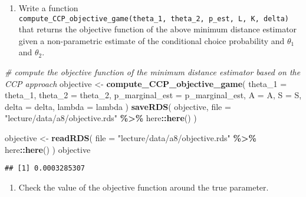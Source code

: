\documentclass[
]{book}
\newenvironment{Shaded}{\begin{snugshade}}{\end{snugshade}}
\newcommand{\AttributeTok}[1]{\textcolor[rgb]{0.13,0.29,0.53}{#1}}
\newcommand{\CommentTok}[1]{\textcolor[rgb]{0.56,0.35,0.01}{\textit{#1}}}
\newcommand{\FunctionTok}[1]{\textcolor[rgb]{0.13,0.29,0.53}{\textbf{#1}}}
\newcommand{\NormalTok}[1]{#1}
\newcommand{\OtherTok}[1]{\textcolor[rgb]{0.56,0.35,0.01}{#1}}
\newcommand{\SpecialCharTok}[1]{\textcolor[rgb]{0.81,0.36,0.00}{\textbf{#1}}}
\newcommand{\StringTok}[1]{\textcolor[rgb]{0.31,0.60,0.02}{#1}}
\providecommand{\tightlist}{%
  \setlength{\itemsep}{0pt}\setlength{\parskip}{0pt}}
\begin{document}
\begin{enumerate}
\def\labelenumi{\arabic{enumi}.}
\setcounter{enumi}{1}
\tightlist
\item
  Write a function \texttt{compute\_CCP\_objective\_game(theta\_1,\ theta\_2,\ p\_est,\ L,\ K,\ delta)} that returns the objective function of the above minimum distance estimator given a non-parametric estimate of the conditional choice probability and \(\theta_1\) and \(\theta_2\).
\end{enumerate}

\begin{Shaded}
\begin{Highlighting}[]
\CommentTok{\# compute the objective function of the minimum distance estimator based on the CCP approach}
\NormalTok{objective }\OtherTok{\textless{}{-}} 
  \FunctionTok{compute\_CCP\_objective\_game}\NormalTok{(}
    \AttributeTok{theta\_1 =}\NormalTok{ theta\_1,}
    \AttributeTok{theta\_2 =}\NormalTok{ theta\_2, }
    \AttributeTok{p\_marginal\_est =}\NormalTok{ p\_marginal\_est,}
    \AttributeTok{A =}\NormalTok{ A,}
    \AttributeTok{S =}\NormalTok{ S, }
    \AttributeTok{delta =}\NormalTok{ delta, }
    \AttributeTok{lambda =}\NormalTok{ lambda}
\NormalTok{    )}
\FunctionTok{saveRDS}\NormalTok{(}
\NormalTok{  objective,}
  \AttributeTok{file =} \StringTok{"lecture/data/a8/objective.rds"} \SpecialCharTok{\%\textgreater{}\%}\NormalTok{ here}\SpecialCharTok{::}\FunctionTok{here}\NormalTok{()}
\NormalTok{)}
\end{Highlighting}
\end{Shaded}

\begin{Shaded}
\begin{Highlighting}[]
\NormalTok{objective }\OtherTok{\textless{}{-}} 
  \FunctionTok{readRDS}\NormalTok{(}
    \AttributeTok{file =} \StringTok{"lecture/data/a8/objective.rds"} \SpecialCharTok{\%\textgreater{}\%}\NormalTok{ here}\SpecialCharTok{::}\FunctionTok{here}\NormalTok{()}
\NormalTok{  )}
\NormalTok{objective}
\end{Highlighting}
\end{Shaded}

\begin{verbatim}
## [1] 0.0003285307
\end{verbatim}

\begin{enumerate}
\def\labelenumi{\arabic{enumi}.}
\setcounter{enumi}{2}
\tightlist
\item
  Check the value of the objective function around the true parameter.
\end{enumerate}
\end{document}

